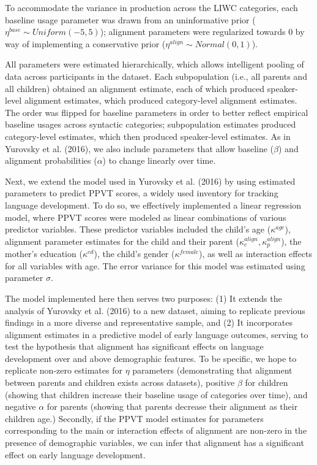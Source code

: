 \documentclass[10pt, letterpaper]{article}
\begin{document}
To accommodate the variance in production across the LIWC categories,
each baseline usage parameter was drawn from an uninformative prior
(\(\eta^{base} \sim Uniform(-5,5)\)); alignment parameters were
regularized towards 0 by way of implementing a conservative prior
(\(\eta^{align} \sim Normal(0,1)\)).

All parameters were estimated hierarchically, which allows intelligent
pooling of data across participants in the dataset. Each subpopulation
(i.e., all parents and all children) obtained an alignment estimate,
each of which produced speaker-level alignment estimates, which produced
category-level alignment estimates. The order was flipped for baseline
parameters in order to better reflect empirical baseline usages across
syntactic categories; subpopulation estimates produced category-level
estimates, which then produced speaker-level estimates. As in Yurovsky
et al. (2016), we also include parameters that allow baseline
(\(\beta\)) and alignment probabilities (\(\alpha\)) to change linearly
over time.

Next, we extend the model used in Yurovsky et al. (2016) by using
estimated parameters to predict PPVT scores, a widely used inventory for
tracking language development. To do so, we effectively implemented a
linear regression model, where PPVT scores were modeled as linear
combinations of various predictor variables. These predictor variables
included the child's age (\(\kappa^{age}\)), alignment parameter
estimates for the child and their parent
(\(\kappa^{align}_{c}, \kappa^{align}_p\)), the mother's education
(\(\kappa^{ed}\)), the child's gender (\(\kappa^{female}\)), as well as
interaction effects for all variables with age. The error variance for
this model was estimated using parameter \(\sigma\).

The model implemented here then serves two purposes: (1) It extends the
analysis of Yurovsky et al. (2016) to a new dataset, aiming to replicate
previous findings in a more diverse and representative sample, and (2)
It incorporates alignment estimates in a predictive model of early
language outcomes, serving to test the hypothesis that alignment has
significant effects on language development over and above demographic
features. To be specific, we hope to replicate non-zero estimates for
\(\eta\) parameters (demonstrating that alignment between parents and
children exists across datasets), positive \(\beta\) for children
(showing that children increase their baseline usage of categories over
time), and negative \(\alpha\) for parents (showing that parents
decrease their alignment as their children age.) Secondly, if the PPVT
model estimates for parameters corresponding to the main or interaction
effects of alignment are non-zero in the presence of demographic
variables, we can infer that alignment has a significant effect on early
language development.
\end{document}
